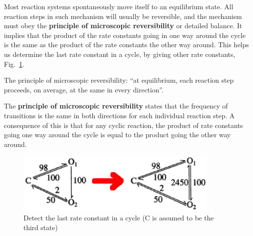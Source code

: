 Most reaction systems spontaneously move itself to an equilibrium
state. All reaction steps in such mechanism will usually be
reversible, and the mechanism must obey the
{\bf principle of microscopic reversibility} or detailed balance.  It
implies that the product of the rate constants going in one way around
the cycle is the same as the product of the rate constants the other
way around. This helps us determine the last rate constant in a cycle,
by giving other rate constants, Fig.~\ref{fig:rc_detect}.

\begin{framed}
  The principle of microscopic reversibility: ``at equilibrium, each
  reaction step proceeds, on average, at the same in every
  direction''.

  The {\bf principle of microscopic reversibility} states that the frequency of
  transitions is the same in both directions for each individual reaction step.
  A consequence of this is that for any cyclic reaction, the product of rate
  constants going one way around the cycle is equal to the product going the
  other way around.
\end{framed}


\begin{figure}[hbt]
  \centerline{\includegraphics[height=3cm,
    angle=0]{./images/rc_detect.eps}}
\caption{Detect the last rate constant in a cycle (C is assumed to be
  the third state)}
\label{fig:rc_detect}
\end{figure}

